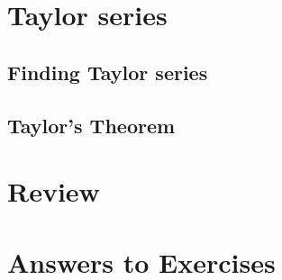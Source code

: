 \documentclass[justified]{tufte-book}
\begin{document}
\chapter{Taylor series}
\label{chapter:taylor-series}

\startcontents[sections]%

\section{Finding Taylor series}
%

\section{Taylor's Theorem}
%

\chapter*{Review}
%

%
%

\finalizeanswers
\chapter*{Answers to Exercises}
\small
{}
\normalsize
\backmatter

\printindex
\end{document}
